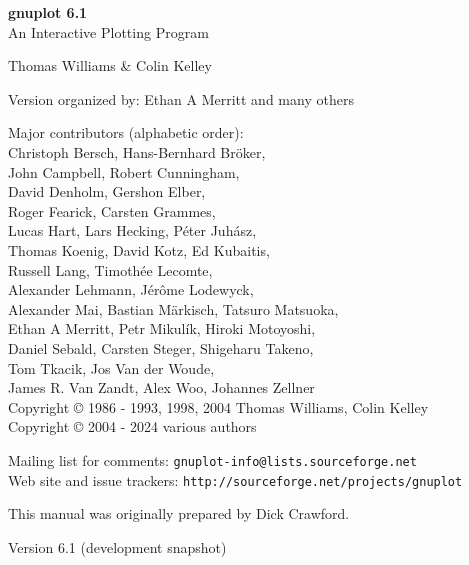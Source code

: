 \documentclass[10pt,twoside]{article}
\def\gpVersion{6.1}
\def\gnuplotVersion{\usebox\GpVersion}
\begin{document}
\sloppy
\thispagestyle{empty}
\rule{0in}{1.0in}

  \begin{center}

  {\huge\bf {gnuplot \gpVersion}}\\
  \vspace{3ex}
  {\Large An Interactive Plotting Program}\\

  \vspace{2ex}

  \large
  Thomas Williams \& Colin Kelley\\

  \vspace{2ex}

  Version
    {\gnuplotVersion }
  organized by: Ethan A Merritt and many others\\

   \vspace{2ex}

  Major contributors (alphabetic order):\\

  Christoph Bersch,
  Hans-Bernhard Bröker,\\
  John Campbell,
  Robert Cunningham,\\
  David Denholm,
  Gershon Elber,\\
  Roger Fearick,
  Carsten Grammes,\\
  Lucas Hart,
  Lars Hecking,
  Péter Juhász,\\
  Thomas Koenig,
  David Kotz,
  Ed Kubaitis,\\
  Russell Lang,
  Timothée Lecomte,\\
  Alexander Lehmann,
  Jérôme Lodewyck,\\
  Alexander Mai,
  Bastian Märkisch,
  Tatsuro Matsuoka, \\
  Ethan A Merritt,
  Petr Mikulík,
  Hiroki Motoyoshi, \\
  Daniel Sebald,
  Carsten Steger,
  Shigeharu Takeno,\\
  Tom Tkacik,
  Jos Van der Woude,\\
  James R. Van Zandt,
  Alex Woo,
  Johannes Zellner\\
  Copyright {\copyright} 1986 - 1993, 1998, 2004   Thomas Williams, Colin Kelley\\
  Copyright {\copyright} 2004 - 2024  various authors\\

  \vspace{2ex}

  Mailing list for comments: \verb+gnuplot-info@lists.sourceforge.net+\\
  Web site and issue trackers: \verb+http://sourceforge.net/projects/gnuplot+

  \vfill
  This manual was originally prepared by Dick Crawford. \\

  \vspace{2ex}

   Version {\gpVersion} (development snapshot)

   \end{center}
\newpage


\hypertarget{TableOfContents}{}
\tableofcontents

\newpage
\end{document}
